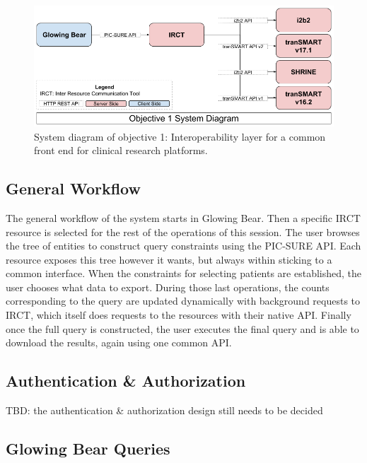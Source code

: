 \begin{figure}[ht]
    \centering
    \includegraphics[width=1\textwidth]{figures/sys_diagram_obj1.png}
    \caption{System diagram of objective 1: Interoperability layer for a common front end for clinical research platforms.}
    \label{fig:sysdiagramobj1}
\end{figure}


\subsection{General Workflow}
The general workflow of the system starts in Glowing Bear.
Then a specific IRCT resource is selected for the rest of the operations of this session.
The user browses the tree of entities to construct query constraints using the PIC-SURE API.
Each resource exposes this tree however it wants, but always within sticking to a common interface.
When the constraints for selecting patients are established, the user chooses what data to export.
During those last operations, the counts corresponding to the query are updated dynamically with background requests to IRCT, which itself does requests to the resources with their native API.
Finally once the full query is constructed, the user executes the final query and is able to download the results, again using one common API.


\subsection{Authentication \& Authorization}
TBD: the authentication \& authorization design still needs to be decided



\subsection{Glowing Bear Queries}

